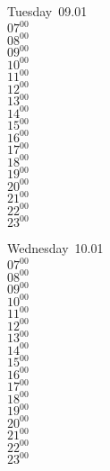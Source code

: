 \documentclass[11pt, a4paper]{book}\usepackage[]{graphicx}\usepackage[]{color}
\begin{document}
\begin{weekdaybox}
  Tuesday~09.01\\
  { 
  \vfill
  $07^{00}$\\
$08^{00}$\\
$09^{00}$\\
$10^{00}$\\
$11^{00}$\\
$12^{00}$\\
$13^{00}$\\
$14^{00}$\\
$15^{00}$\\
$16^{00}$\\
$17^{00}$\\
$18^{00}$\\
$19^{00}$\\
$20^{00}$\\
$21^{00}$\\
$22^{00}$\\
$23^{00}$\\
  }
\end{weekdaybox}
\begin{weekdaybox}
  Wednesday~10.01\\
  { 
  \vfill
  $07^{00}$\\
$08^{00}$\\
$09^{00}$\\
$10^{00}$\\
$11^{00}$\\
$12^{00}$\\
$13^{00}$\\
$14^{00}$\\
$15^{00}$\\
$16^{00}$\\
$17^{00}$\\
$18^{00}$\\
$19^{00}$\\
$20^{00}$\\
$21^{00}$\\
$22^{00}$\\
$23^{00}$\\
  }
\end{weekdaybox}
\clearpage
\begin{headerbox}
\end{headerbox}
\end{document}

